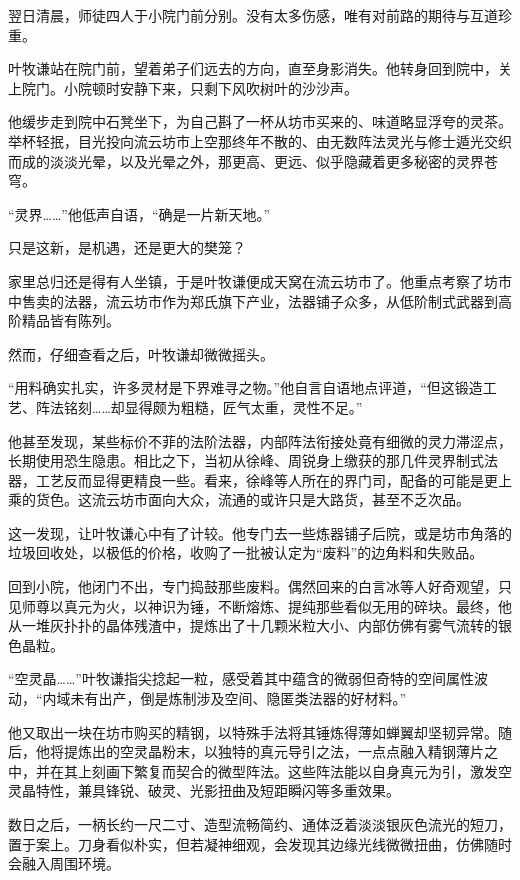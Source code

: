 翌日清晨，师徒四人于小院门前分别。没有太多伤感，唯有对前路的期待与互道珍重。

叶牧谦站在院门前，望着弟子们远去的方向，直至身影消失。他转身回到院中，关上院门。小院顿时安静下来，只剩下风吹树叶的沙沙声。

他缓步走到院中石凳坐下，为自己斟了一杯从坊市买来的、味道略显浮夸的灵茶。举杯轻抿，目光投向流云坊市上空那终年不散的、由无数阵法灵光与修士遁光交织而成的淡淡光晕，以及光晕之外，那更高、更远、似乎隐藏着更多秘密的灵界苍穹。

“灵界……”他低声自语，“确是一片新天地。”

只是这新，是机遇，还是更大的樊笼？

\vspace{2em}

家里总归还是得有人坐镇，于是叶牧谦便成天窝在流云坊市了。他重点考察了坊市中售卖的法器，流云坊市作为郑氏旗下产业，法器铺子众多，从低阶制式武器到高阶精品皆有陈列。

然而，仔细查看之后，叶牧谦却微微摇头。

“用料确实扎实，许多灵材是下界难寻之物。”他自言自语地点评道，“但这锻造工艺、阵法铭刻……却显得颇为粗糙，匠气太重，灵性不足。”

他甚至发现，某些标价不菲的法阶法器，内部阵法衔接处竟有细微的灵力滞涩点，长期使用恐生隐患。相比之下，当初从徐峰、周锐身上缴获的那几件灵界制式法器，工艺反而显得更精良一些。看来，徐峰等人所在的界门司，配备的可能是更上乘的货色。这流云坊市面向大众，流通的或许只是大路货，甚至不乏次品。

这一发现，让叶牧谦心中有了计较。他专门去一些炼器铺子后院，或是坊市角落的垃圾回收处，以极低的价格，收购了一批被认定为“废料”的边角料和失败品。

回到小院，他闭门不出，专门捣鼓那些废料。偶然回来的白言冰等人好奇观望，只见师尊以真元为火，以神识为锤，不断熔炼、提纯那些看似无用的碎块。最终，他从一堆灰扑扑的晶体残渣中，提炼出了十几颗米粒大小、内部仿佛有雾气流转的银色晶粒。

“空灵晶……”叶牧谦指尖捻起一粒，感受着其中蕴含的微弱但奇特的空间属性波动，“内域未有出产，倒是炼制涉及空间、隐匿类法器的好材料。”

他又取出一块在坊市购买的精钢，以特殊手法将其锤炼得薄如蝉翼却坚韧异常。随后，他将提炼出的空灵晶粉末，以独特的真元导引之法，一点点融入精钢薄片之中，并在其上刻画下繁复而契合的微型阵法。这些阵法能以自身真元为引，激发空灵晶特性，兼具锋锐、破灵、光影扭曲及短距瞬闪等多重效果。

数日之后，一柄长约一尺二寸、造型流畅简约、通体泛着淡淡银灰色流光的短刀，置于案上。刀身看似朴实，但若凝神细观，会发现其边缘光线微微扭曲，仿佛随时会融入周围环境。

